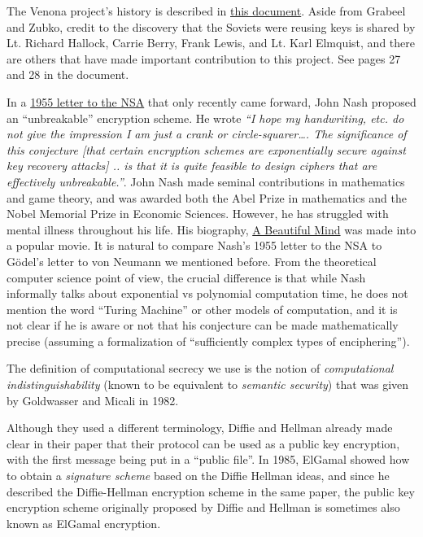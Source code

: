 The Venona project's history is described in
\href{http://nsarchive.gwu.edu/NSAEBB/NSAEBB278/01.PDF}{this document}.
Aside from Grabeel and Zubko, credit to the discovery that the Soviets
were reusing keys is shared by Lt. Richard Hallock, Carrie Berry, Frank
Lewis, and Lt. Karl Elmquist, and there are others that have made
important contribution to this project. See pages 27 and 28 in the
document.

In a
\href{https://www.nsa.gov/news-features/declassified-documents/nash-letters/assets/files/nash_letters1.pdf}{1955
letter to the NSA} that only recently came forward, John Nash proposed
an ``unbreakable'' encryption scheme. He wrote \emph{``I hope my
handwriting, etc. do not give the impression I am just a crank or
circle-squarer\ldots. The significance of this conjecture {[}that
certain encryption schemes are exponentially secure against key recovery
attacks{]} .. is that it is quite feasible to design ciphers that are
effectively unbreakable.''}. John Nash made seminal contributions in
mathematics and game theory, and was awarded both the Abel Prize in
mathematics and the Nobel Memorial Prize in Economic Sciences. However,
he has struggled with mental illness throughout his life. His biography,
\href{https://en.wikipedia.org/wiki/A_Beautiful_Mind_(book)}{A Beautiful
Mind} was made into a popular movie. It is natural to compare Nash's
1955 letter to the NSA to Gödel's letter to von Neumann we mentioned
before. From the theoretical computer science point of view, the crucial
difference is that while Nash informally talks about exponential vs
polynomial computation time, he does not mention the word ``Turing
Machine'' or other models of computation, and it is not clear if he is
aware or not that his conjecture can be made mathematically precise
(assuming a formalization of ``sufficiently complex types of
enciphering'').

The definition of computational secrecy we use is the notion of
\emph{computational indistinguishability} (known to be equivalent to
\emph{semantic security}) that was given by Goldwasser and Micali in
1982.

Although they used a different terminology, Diffie and Hellman already
made clear in their paper that their protocol can be used as a public
key encryption, with the first message being put in a ``public file''.
In 1985, ElGamal showed how to obtain a \emph{signature scheme} based on
the Diffie Hellman ideas, and since he described the Diffie-Hellman
encryption scheme in the same paper, the public key encryption scheme
originally proposed by Diffie and Hellman is sometimes also known as
ElGamal encryption.

